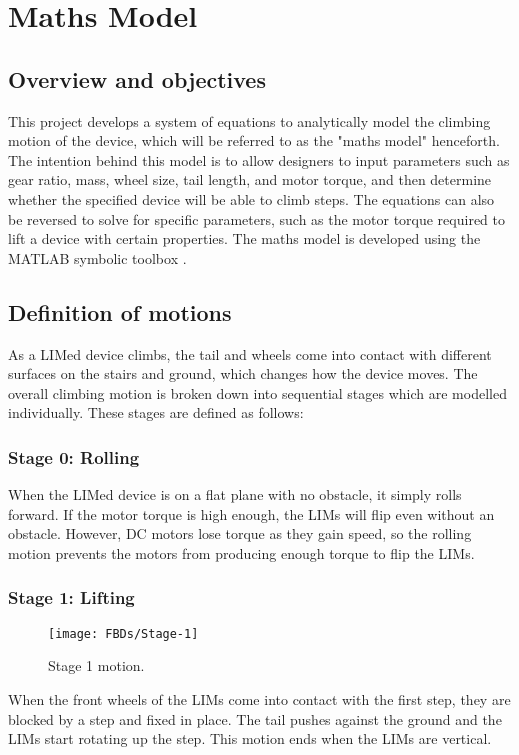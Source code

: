 \chapter{Maths Model}

\section{Overview and objectives}

This project develops a system of equations to analytically model the climbing motion of the device, which will be referred to as the "maths model" henceforth. The intention behind this model is to allow designers to input parameters such as gear ratio, mass, wheel size, tail length, and motor torque, and then determine whether the specified device will be able to climb steps. The equations can also be reversed to solve for specific parameters, such as the motor torque required to lift a device with certain properties. The maths model is developed using the MATLAB symbolic toolbox \citep{matlab}.\\

\section{Definition of motions}

As a LIMed device climbs, the tail and wheels come into contact with different surfaces on the stairs and ground, which changes how the device moves. The overall climbing motion is broken down into sequential stages which are modelled individually. These stages are defined as follows:\\
\subsection*{Stage 0: Rolling}

When the LIMed device is on a flat plane with no obstacle, it simply rolls forward. If the motor torque is high enough, the LIMs will flip even without an obstacle. However, DC motors lose torque as they gain speed, so the rolling motion prevents the motors from producing enough torque to flip the LIMs.\\


\subsection*{Stage 1: Lifting}
\begin{wrapfigure}{r}{0.35\textwidth} %
	\centering
	\texttt{[image: FBDs/Stage-1]}
	\caption{Stage 1 motion.}
	\label{fig:stage1}
\end{wrapfigure}
When the front wheels of the LIMs come into contact with the first step, they are blocked by a step and fixed in place. The tail pushes against the ground and the LIMs start rotating up the step. This motion ends when the LIMs are vertical.
\\
